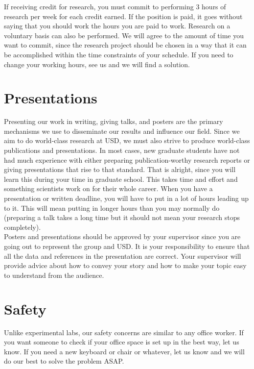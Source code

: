 \documentclass[letterpaper]{article}
\begin{document}
If receiving credit for research, you must commit to performing 3 hours of research per week for each credit earned. If the position is paid, it goes without saying that you should work the hours you are paid to work. Research on a voluntary basis can also be performed. We will agree to the amount of time you want to commit, since the research project should be chosen in a way that it can be accomplished within the time constraints of your schedule. If you need to change your working hours, see us and we will find a solution.


\section*{Presentations}
Presenting our work in writing, giving talks, and posters are the primary mechanisms we use to disseminate our results and influence our field. Since we aim to do world-class research at USD, we must also strive to produce world-class publications and presentations. In most cases, new graduate students have not had much experience with either preparing publication-worthy research reports or giving presentations that rise to that standard. That is alright, since you will learn this during your time in graduate school. This takes time and effort and something scientists work on for their whole career. When you have a presentation or written deadline, you will have to put in a lot of hours leading up to it. This will mean putting in longer hours than you may normally do (preparing a talk takes a long time but it should not mean your research stops completely).\\

Posters and presentations should be approved by your supervisor since you are going out to represent the group and USD. It is your responsibility to ensure that all the data and references in the presentation are correct. Your supervisor will provide advice about how to convey your story and how to make your topic easy to understand from the audience.


\section*{Safety}

Unlike experimental labs, our safety concerns are similar to any office worker. If you want someone to check if your office space is set up in the best way, let us know. If you need a new keyboard or chair or whatever, let us know and we will do our best to solve the problem ASAP.
\end{document}
